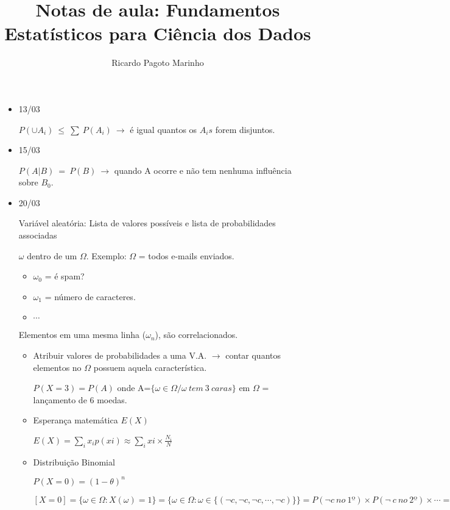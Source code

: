 \documentclass[11pt,a4paper]{book}
\title{Notas de aula: Fundamentos Estatísticos para Ciência dos Dados}
\author{Ricardo Pagoto Marinho}
\begin{document}
\maketitle
	\begin{itemize}
		\item 13/03
		
		$P(\cup A_i)~\leq~\sum~P(A_i)~\rightarrow$ é igual quantos os $A_is$ forem disjuntos.
		
		\item 15/03
		
		$P(A|B)~=~P(B)~\rightarrow$ quando A ocorre e não tem nenhuma influência sobre $B_0$.
		
		\item 20/03
		
		Variável aleatória: Lista de valores possíveis e lista de probabilidades associadas
		
		$\omega$ dentro de um $\Omega$.
		Exemplo: $\Omega$ = todos e-mails enviados.
		\begin{itemize}
			\item $\omega_0$ = é spam?
			\item $\omega_1$ = número de caracteres.
			\item $\cdots$
		\end{itemize}
		Elementos em uma mesma linha ($\omega_n$), são correlacionados. 
		
		\begin{itemize}
			\item Atribuir valores de probabilidades a uma V.A. $\rightarrow$ contar quantos elementos no $\Omega$ possuem aquela característica.
			
			$P(X=3) = P(A)$ onde A=$\lbrace \omega \in \Omega / \omega~tem~3~caras \rbrace$ em $\Omega$ = lançamento de 6 moedas.
			\item Esperança matemática $E(X)$
			
			$E(X)= \sum_i x_ip(xi) \approx \sum_i xi\times \frac{N_i}{N}$
			
			\item Distribuição Binomial
			
			$P(X=0) = (1-\theta)^{n}$
			
			$[X=0]=\lbrace\omega \in \Omega:X(\omega)=1\rbrace=\lbrace\omega \in \Omega: \omega \in \lbrace(\neg c,\neg c,\neg c,\cdots,\neg c)\rbrace\rbrace=P(\neg c~no~1º)\times P(\neg~c~no~2º)\times \cdots = (1-\theta)\times(1-\theta)\cdots = (1-\theta)^{n}$
			
		\end{itemize}
		

\end{itemize}
\end{document}
